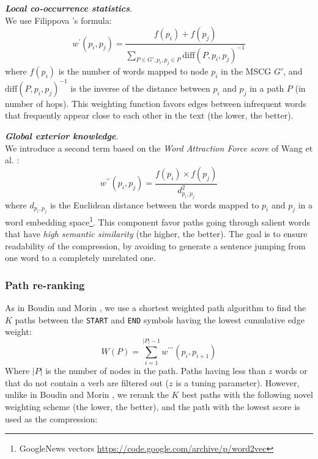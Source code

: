 \documentclass[11pt,a4paper]{article}
\begin{document}
\textbf{\textit{Local co-occurrence statistics}}. \\
We use Filippova 's formula:
\begin{equation}
w^\prime (p_i, p_j) = \frac{f(p_i) + f(p_j)}{\sum_{P \in G', p_i, p_j \in P} \mathrm{diff}(P, p_i, p_j)^{- 1}}
\end{equation}
where $f(p_i)$ is the number of words mapped to node $p_i$ in the MSCG $G'$, and $\mathrm{diff}(P, p_i, p_j)^{- 1}$ is the inverse of the distance between $p_i$ and $p_j$ in a path $P$ (in number of hops). This weighting function favors edges between infrequent words that frequently appear close to each other in the text (the lower, the better).

\textbf{\textit{Global exterior knowledge}}. \\
We introduce a second term based on the \textit{Word Attraction Force score} of Wang et al. :
\begin{equation}
w^{\prime\prime} (p_i, p_j) = \frac{f(p_i) \times f(p_j)}{d_{p_i,p_j}^2}
\end{equation}
where $d_{p_i,p_j}$ is the Euclidean distance between the words mapped to $p_i$ and $p_j$ in a word embedding space\footnote{\tiny{GoogleNews vectors \url{https://code.google.com/archive/p/word2vec}}}. This component favor paths going through salient words that have \textit{high semantic similarity} (the higher, the better). The goal is to ensure readability of the compression, by avoiding to generate a sentence jumping from one word to a completely unrelated one.

\subsubsection*{Path re-ranking}
As in Boudin and Morin , we use a shortest weighted path algorithm to find the $K$ paths between the \texttt{START} and \texttt{END} symbols having the lowest cumulative edge weight:
\begin{equation}
W (P) = \sum_{i = 1}^{|P| - 1} w^{\prime\prime\prime} (p_i, p_{i + 1})
\end{equation}
Where $|P|$ is the number of nodes in the path. Paths having less than $z$ words or that do not contain a verb are filtered out ($z$ is a tuning parameter). However, unlike in Boudin and Morin , we rerank the $K$ best paths with the following novel weighting scheme (the lower, the better), and the path with the lowest score is used as the compression:
\end{document}
